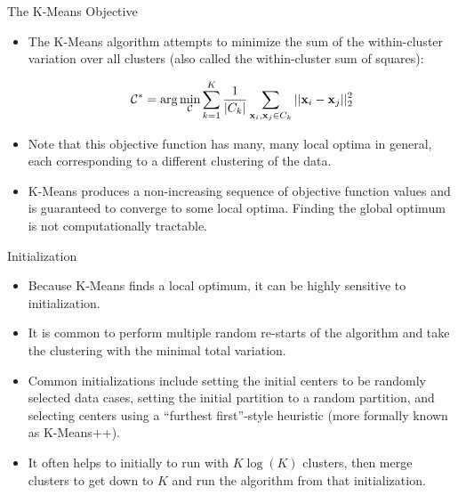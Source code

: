 \documentclass[serif,xcolor=pdftex,dvipsnames,table,hyperref={bookmarks=false,breaklinks}]{beamer}
\begin{document}
\begin{frame}[t]{The K-Means Objective}

\begin{itemize}
\item The K-Means algorithm attempts to minimize the sum of the within-cluster
variation over all clusters (also called the within-cluster sum of squares):

$$\mathcal{C}^* = \arg\min_{\mathcal{C}} 
\sum_{k=1}^K\frac{1}{|C_k|}\sum_{{\mathbf{x}}_i,{\mathbf{x}}_j\in C_k} 
||{\mathbf{x}}_i-{\mathbf{x}}_j||_2^2$$

\pause\item Note that this objective function has many, many local optima in 
general, each corresponding to a different clustering of the data. 

\pause\item K-Means produces a non-increasing sequence of objective function 
values and is guaranteed to converge to some local optima. Finding the global
optimum is not computationally tractable.


\end{itemize} 

\end{frame}


\begin{frame}[t]{Initialization}

\begin{itemize}
\item Because K-Means finds a local optimum, it can be highly sensitive to 
initialization.

\pause\item It is common to perform multiple random re-starts of the algorithm
and take the clustering with the minimal total variation.

\pause\item Common initializations include setting the initial 
centers to be randomly selected data cases, setting the initial partition to
a random partition, and selecting centers using a ``furthest first''-style 
heuristic (more formally known as K-Means++).

\pause\item It often helps to initially to run with $K\log(K)$ 
clusters, then merge clusters to get down to $K$ and run the algorithm
from that initialization.

\end{itemize} 

\end{frame}
\end{document}
